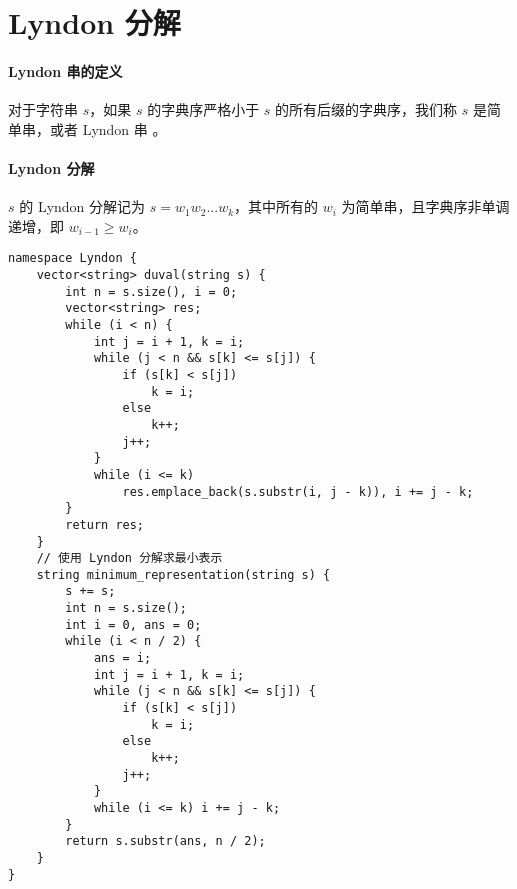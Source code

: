 \section{Lyndon 分解}

\paragraph{Lyndon 串的定义} 对于字符串 $s$，如果 $s$ 的字典序严格小于 $s$ 的所有后缀的字典序，我们称 $s$ 是简单串，或者 Lyndon 串 。

\paragraph{Lyndon 分解} $s$ 的 Lyndon 分解记为 $s = w_1w_2...w_k$，其中所有的 $w_i$ 为简单串，且字典序非单调递增，即 $w_{i-1} \ge w_i$。

\begin{verbatim}
namespace Lyndon {
    vector<string> duval(string s) {
        int n = s.size(), i = 0;
        vector<string> res;
        while (i < n) {
            int j = i + 1, k = i;
            while (j < n && s[k] <= s[j]) {
                if (s[k] < s[j])
                    k = i;
                else
                    k++;
                j++;
            }
            while (i <= k)
                res.emplace_back(s.substr(i, j - k)), i += j - k;
        }
        return res;
    }
    // 使用 Lyndon 分解求最小表示
    string minimum_representation(string s) {
        s += s;
        int n = s.size();
        int i = 0, ans = 0;
        while (i < n / 2) {
            ans = i;
            int j = i + 1, k = i;
            while (j < n && s[k] <= s[j]) {
                if (s[k] < s[j])
                    k = i;
                else
                    k++;
                j++;
            }
            while (i <= k) i += j - k;
        }
        return s.substr(ans, n / 2);
    }    
}
\end{verbatim}